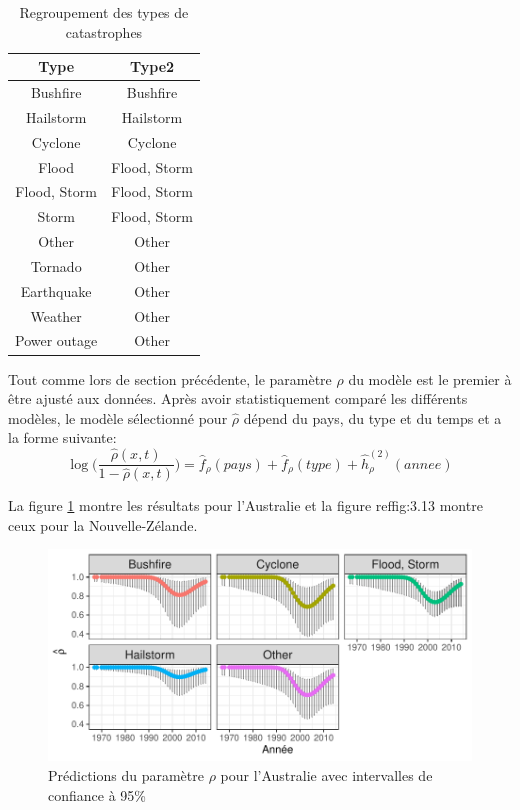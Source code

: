 \begin{table}[ht]
\centering
\begin{tabular}{cc}
  \hline
Type & Type2 \\ 
  \hline
Bushfire & Bushfire \\ 
  Hailstorm & Hailstorm \\ 
  Cyclone & Cyclone \\ 
  Flood & Flood, Storm \\ 
  Flood, Storm & Flood, Storm \\ 
  Storm & Flood, Storm \\ 
  Other & Other \\ 
  Tornado & Other \\ 
  Earthquake & Other \\ 
  Weather & Other \\ 
  Power outage & Other \\ 
   \hline
\end{tabular}
\caption{Regroupement des types de catastrophes} 
\label{tab:3.7}
\end{table}
Tout comme lors de section précédente, le paramètre $\rho$ du modèle est le premier à être ajusté aux données. Après avoir statistiquement comparé les différents modèles, le modèle sélectionné pour $\hat\rho$ dépend du pays, du type et du temps et a la forme suivante:
\begin{equation}\label{eq:3.4.1}
\log\Bigg(\frac{\hat\rho(x,t)}{1-\hat\rho(x,t)}\Bigg) = \hat{f}_\rho(pays) + \hat{f}_\rho(type) + \hat{h}^{(2)}_\rho(annee)
\end{equation}

La figure \ref{fig:3.12} montre les résultats pour l'Australie et la figure ref{fig:3.13} montre ceux pour la Nouvelle-Zélande.
\\



\begin{figure}[h]
\begin{center}
\includegraphics{images/fig-023}
\end{center}
\caption{Prédictions du paramètre $\rho$ pour l'Australie avec intervalles de confiance à 95\%}
\label{fig:3.12}
\end{figure}

